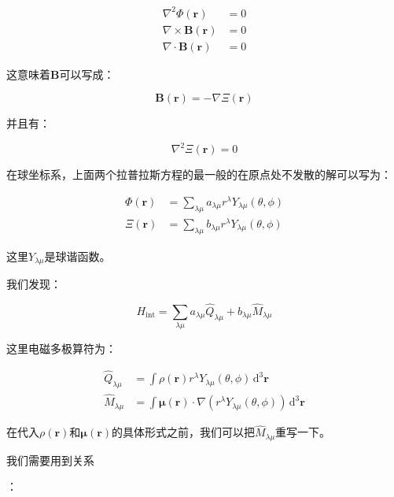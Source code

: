 \begin{align}
\nabla^{2}\Phi(\boldsymbol{r}) & =0\nonumber \\
\nabla\times\boldsymbol{B}(\boldsymbol{r}) & =0\\
\nabla\cdot\boldsymbol{B}(\boldsymbol{r}) & =0\nonumber 
\end{align}

这意味着$\boldsymbol{B}$可以写成：

\begin{equation}
\boldsymbol{B}(\boldsymbol{r})=-\nabla\Xi(\boldsymbol{r})
\end{equation}

并且有：

\begin{equation}
\nabla^{2}\Xi(\boldsymbol{r})=0
\end{equation}

在球坐标系，上面两个拉普拉斯方程的最一般的在原点处不发散的解可以写为：

\begin{align}
\Phi(\boldsymbol{r}) & =\sum_{\lambda\mu}a_{\lambda\mu}r^{\lambda}Y_{\lambda\mu}(\theta,\phi)\\
\Xi(\boldsymbol{r}) & =\sum_{\lambda\mu}b_{\lambda\mu}r^{\lambda}Y_{\lambda\mu}(\theta,\phi)
\end{align}

这里$Y_{\lambda\mu}$是球谐函数。

我们发现：

\begin{equation}
H_{\text{int}}=\sum_{\lambda\mu}a_{\lambda\mu}\hat{Q}_{\lambda\mu}+b_{\lambda\mu}\hat{M}_{\lambda\mu}
\end{equation}

这里电磁多极算符为：

\begin{align}
\hat{Q}_{\lambda\mu} & =\int\rho(\boldsymbol{r})r^{\lambda}Y_{\lambda\mu}(\theta,\phi)\,\mathrm{d}^{3}\boldsymbol{r}\\
\hat{M}_{\lambda\mu} & =\int\boldsymbol{\mu}(\boldsymbol{r})\cdot\nabla(r^{\lambda}Y_{\lambda\mu}(\theta,\phi))\,\mathrm{d}^{3}\boldsymbol{r}
\end{align}

在代入$\rho(\boldsymbol{r})$和$\boldsymbol{\mu}(\boldsymbol{r})$的具体形式之前，我们可以把$\hat{M}_{\lambda\mu}$重写一下。

我们需要用到关系

：

